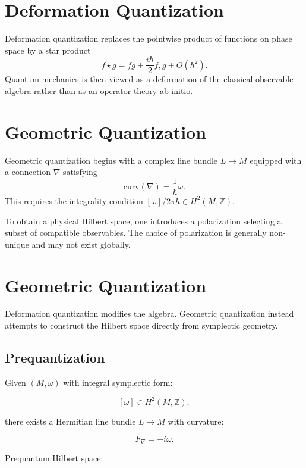 \section{Deformation Quantization}

Deformation quantization replaces the pointwise product of functions on phase space by a star product
\begin{equation}
f \star g = fg + \frac{i\hbar}{2}{f,g} + O(\hbar^2).
\end{equation}
Quantum mechanics is then viewed as a deformation of the classical observable algebra rather than as an operator theory ab initio.

\section{Geometric Quantization}

Geometric quantization begins with a complex line bundle $L \to M$ equipped with a connection $\nabla$ satisfying
\begin{equation}
\mathrm{curv}(\nabla) = \frac{1}{\hbar}\omega.
\end{equation}
This requires the integrality condition $[\omega]/2\pi\hbar \in H^2(M,\mathbb{Z})$.

To obtain a physical Hilbert space, one introduces a polarization selecting a subset of compatible observables. The choice of polarization is generally non-unique and may not exist globally.

\section{Geometric Quantization}

Deformation quantization modifies the algebra. 
Geometric quantization instead attempts to construct the Hilbert space 
directly from symplectic geometry.

\subsection{Prequantization}

Given $(M,\omega)$ with integral symplectic form:

\[
[\omega] \in H^2(M,\mathbb Z),
\]

there exists a Hermitian line bundle $L \to M$ with curvature:

\[
F_\nabla = -i\omega.
\]

Prequantum Hilbert space:

